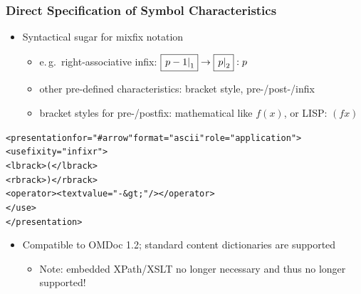\documentclass[pdftex,xcolor=svgnames]{beamer}
\def\imarg#1#2{\fbox{\ensuremath{\left.#1\right|_{#2}}}}
\begin{document}
\begin{frame}[fragile]
  \frametitle{Direct Specification of Symbol Characteristics}
  \begin{itemize}
  \item Syntactical sugar for mixfix notation
    \begin{itemize}
    \item e.\,g.\ right-associative infix: $\imarg{p-1}{1}\to\imarg{p}{2}:p$ 
    \item other pre-defined characteristics: bracket style, pre-/post-/infix
    \item bracket styles for pre-/postfix: mathematical like $f(x)$, or LISP: $(f x)$
    \end{itemize}
  \end{itemize}
  {\scriptsize
\begin{alltt}
<presentation for="\#arrow" format="ascii" role="application">
  <use fixity="infixr">
    <lbrack>(</lbrack>
    <rbrack>)</rbrack>
    <operator><text value=" -\&gt; "/></operator>
  </use>
</presentation>
\end{alltt}}
  \begin{itemize}
  \item Compatible to OMDoc 1.2; {\openmath} standard content dictionaries are supported
    \begin{itemize}
    \item Note: embedded XPath/XSLT no longer necessary and thus no longer
      supported!
    \end{itemize}
  \end{itemize}
\end{frame}
\end{document}
